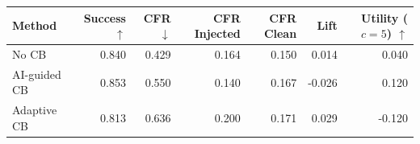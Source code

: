 \begin{tabular}{lrrrrrr}
\toprule
Method & Success $\uparrow$ & CFR $\downarrow$ & CFR Injected & CFR Clean & Lift & Utility ($c=5$) $\uparrow$ \\
\midrule
No CB & 0.840 & 0.429 & 0.164 & 0.150 & 0.014 & 0.040 \\
AI-guided CB & 0.853 & 0.550 & 0.140 & 0.167 & -0.026 & 0.120 \\
Adaptive CB & 0.813 & 0.636 & 0.200 & 0.171 & 0.029 & -0.120 \\
\bottomrule
\end{tabular}

